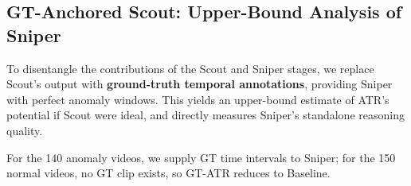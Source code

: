 \subsection{GT-Anchored Scout: Upper-Bound Analysis of Sniper}
\label{sec:gt_scout}

To disentangle the contributions of the Scout and Sniper stages, we replace Scout's output with \textbf{ground-truth temporal annotations}, providing Sniper with perfect anomaly windows. This yields an upper-bound estimate of ATR's potential if Scout were ideal, and directly measures Sniper's standalone reasoning quality.

For the 140 anomaly videos, we supply GT time intervals to Sniper; for the 150 normal videos, no GT clip exists, so GT-ATR reduces to Baseline.

\begin{table}[t]
  \centering
  \caption{GT-Anchored Scout: Baseline vs.\ Scout-ATR vs.\ GT-ATR on UCF-Crime ($N$=290: 140 anomaly + 150 normal). GT-ATR shares TN/FP with Baseline on normal videos.}
  \label{tab:gt_scout}
\end{table}

